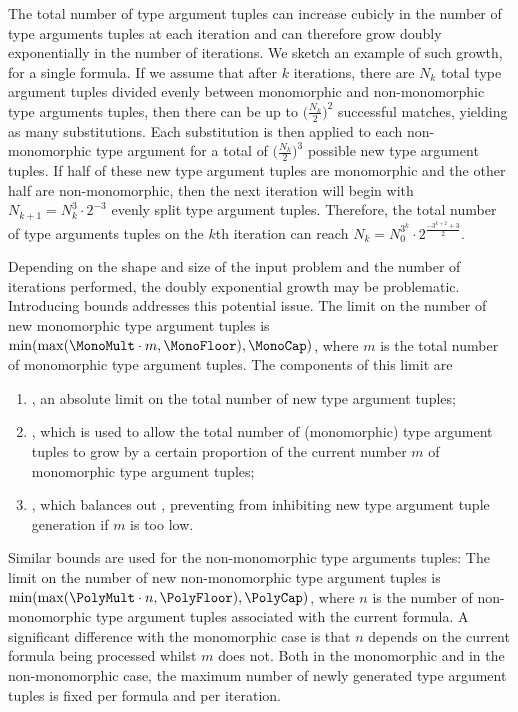 \documentclass[]{ceurart}
\begin{document}
The total number of type argument tuples can increase cubicly in the number of type arguments tuples at each iteration and can therefore grow doubly exponentially in the number of iterations. We sketch an example of such growth, for a single formula. If we assume that after \(k\) iterations, there are \(N_k\) total type argument tuples divided evenly between monomorphic and non-monomorphic type arguments tuples, then there can be up to \(\bigl(\frac{N_k}{2}\bigr)^2\) successful matches, yielding as many substitutions. Each substitution is then applied to each non-monomorphic type argument for a total of \(\bigl(\frac{N_k}{2}\bigr)^3\) possible new type argument tuples. If half of these new type argument tuples are monomorphic and the other half are non-monomorphic, then the next iteration will begin with \(N_{k+1} = N_k^3 \cdot 2^{-3}\) evenly split type argument tuples. Therefore, the total number of type arguments tuples on the \(k\)th iteration can reach \(N_k = N_0^{3^k} \cdot 2^{\frac{-3^{k+2}+3}{2}}\).

   Depending on the shape and size of the input problem and the number of iterations performed, the doubly exponential growth may be problematic. Introducing bounds addresses this potential issue. The limit on the number of new monomorphic type argument tuples is \(\min(\max(\MonoMult\cdot m, \MonoFloor), \MonoCap)\), where \(m\) is the total number of monomorphic type argument tuples. The components of this limit are
\begin{enumerate}
   \item \MonoCap, an absolute limit on the total number of new type argument tuples;
   \item \MonoMult, which is used to allow the total number of (monomorphic) type argument tuples to grow by a certain proportion of the current number \(m\) of monomorphic type argument tuples;
   \item \MonoFloor, which balances out \MonoMult, preventing \MonoMult from inhibiting new type argument tuple generation if \(m\) is too low.
\end{enumerate}

Similar bounds are used for the non-monomorphic type arguments tuples:
The limit on the number of new non-monomorphic type argument tuples is \(\min(\max(\PolyMult\cdot n, \PolyFloor),\allowbreak \PolyCap)\), where \(n\) is the number of non-monomorphic type argument tuples associated with the current formula. A significant difference with the monomorphic case is that \(n\) depends on the current formula being processed whilst \(m\) does not.
Both in the monomorphic and in the non-monomorphic case, the maximum number of newly generated type argument tuples is fixed per formula and per iteration.
\end{document}
